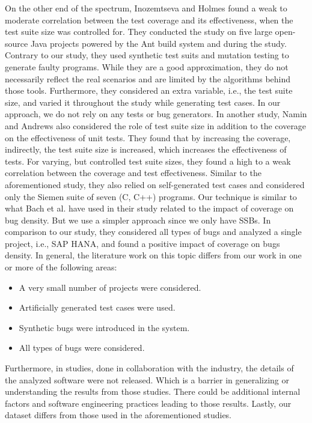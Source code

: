 \documentclass[sigconf,nonacm]{acmart}
\begin{document}
On the other end of the spectrum, Inozemtseva and Holmes \cite{waterloo} found a weak to moderate correlation between the test coverage and its effectiveness, when the test suite size was controlled for. They conducted the study on five large open-source Java projects powered by the Ant build system and during the study. Contrary to our study, they used synthetic test suits and mutation testing to generate faulty programs. While they are a good approximation, they do not necessarily reflect the real scenarios and are limited by the algorithms behind those tools. Furthermore, they considered an extra variable, i.e., the test suite size, and varied it throughout the study while generating test cases. In our approach, we do not rely on any tests or bug generators. In another study, Namin and Andrews \cite{waterloo2} also considered the role of test suite size in addition to the coverage on the effectiveness of unit tests. They found that by increasing the coverage, indirectly, the test suite size is increased, which increases the effectiveness of tests. For varying, but controlled test suite sizes, they found a high to a weak correlation between the coverage and test effectiveness. Similar to the aforementioned study, they also relied on self-generated test cases and considered only the Siemen suite of seven (C, C++) programs. Our technique is similar to what Bach et al. \cite{similar} have used in their study related to the impact of coverage on bug density. But we use a simpler approach since we only have SSBs. In comparison to our study, they considered all types of bugs and analyzed a single project, i.e., SAP HANA, and found a positive impact of coverage on bugs density. In general, the literature work on this topic differs from our work in one or more of the following areas:
\begin{itemize}
	\item A very small number of projects were considered.
	\item Artificially generated test cases were used.
	\item Synthetic bugs were introduced in the system.
	\item All types of bugs were considered.
\end{itemize}

Furthermore, in studies, done in collaboration with the industry, the details of the analyzed software were not released. Which is a barrier in generalizing or understanding the results from those studies. There could be additional internal factors and software engineering practices leading to those results. Lastly, our dataset differs from those used in the aforementioned studies.
\end{document}
